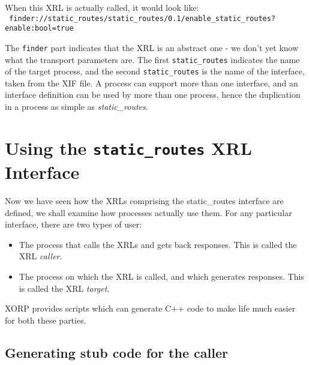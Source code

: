 \documentclass[11pt]{article}
\newcommand{\stt}{\tt\small}
\newcommand{\SR}{{\tt\small static\_routes}\xspace}
\newcommand{\SRI}{{\it static\_routes}\xspace}
\begin{document}
\vspace{0.1in}
\noindent
When this XRL is actually called, it would look like:\\
{\tt\small
  finder://static\_routes/static\_routes/0.1/enable\_static\_routes?enable:bool=true}

\vspace{0.1in} The {\stt finder} part indicates that the XRL is an
abstract one - we don't yet know what the transport parameters are.
The first \SR indicates the name of the target process, and the second
\SR is the name of the interface, taken from the XIF
file.  A process can support more than one interface, and an interface
definition can be used by more than one process, hence the duplication
in a process as simple as \SRI.

\newpage
\section{Using the {\tt static\_routes} XRL Interface}

Now we have seen how the XRLs comprising the static\_routes interface
are defined, we shall examine how processes actually use them.  For
any particular interface, there are two types of user:
\begin{itemize}
\item The process that calls the XRLs and gets back responses.  This
is called the XRL {\it caller}.
\item The process on which the XRL is called, and which generates
responses.  This is called the XRL {\it target}.
\end{itemize}
XORP provides scripts which can generate C++ code to make life much
easier for both these parties.

\subsection{Generating stub code for the caller}
\end{document}
